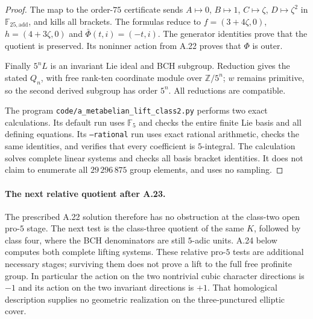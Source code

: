 \begin{proof}
The map to the order-$75$ certificate sends
$A\mapsto0$, $B\mapsto1$, $C\mapsto\zeta$,
$D\mapsto\zeta^2$ in $\mathbb F_{25,\mathrm{add}}$,
and kills all brackets. The formulas reduce to
$f=(3+4\zeta,0)$, $h=(4+3\zeta,0)$ and
$\bar\Phi(t,i)=(-t,i)$.
The generator identities prove that the quotient is
preserved. Its noninner action from A.22 proves that
$\Phi$ is outer.

Finally $5^nL$ is an invariant Lie ideal and BCH
subgroup. Reduction gives the stated $Q_n$, with
free rank-ten coordinate module over
$\mathbb Z/5^n$; $w$ remains primitive, so the second
derived subgroup has order $5^n$.
All reductions are compatible.

The program
\texttt{code/a\_metabelian\_lift\_class2.py}
performs two exact calculations. Its default run uses
$\mathbb F_5$ and checks the entire finite Lie basis
and all defining equations. Its
\texttt{--rational} run uses exact rational arithmetic,
checks the same identities, and verifies that every
coefficient is $5$-integral. The calculation solves
complete linear systems and checks all basis bracket
identities. It does not claim to enumerate all
$29\,296\,875$ group elements, and uses no sampling.
\end{proof}

\paragraph{The next relative quotient after A.23.}
The prescribed A.22 solution therefore has no obstruction
at the class-two open pro-$5$ stage. The next test is
the class-three quotient of the same $K$, followed by
class four, where the BCH denominators are still
$5$-adic units. A.24 below computes both complete
lifting systems. These relative pro-$5$ tests are
additional necessary stages; surviving them does not
prove a lift to the full free profinite group.
In particular the action on the two nontrivial cubic
character directions is $-1$ and its action on the
two invariant directions is $+1$. That homological
description supplies no geometric realization on
the three-punctured elliptic cover.

